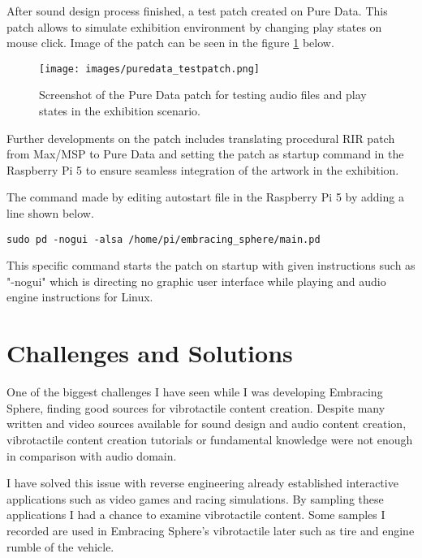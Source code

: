         After sound design process finished, a test patch created on Pure Data. This patch allows to simulate exhibition environment by changing play states on mouse click. Image of the patch can be seen in the figure \ref{fig:PUREDATA} below.\par

        \begin{figure}[H]
            \centering
            \texttt{[image: images/puredata\_testpatch.png]}
            \caption{Screenshot of the Pure Data patch for testing audio files and play states in the exhibition scenario.}
            \label{fig:PUREDATA}
        \end{figure}

        Further developments on the patch includes translating procedural RIR patch from Max/MSP to Pure Data and setting the patch as startup command in the Raspberry Pi 5 to ensure seamless integration of the artwork in the exhibition.\par

        The command made by editing autostart file in the Raspberry Pi 5 by adding a line shown below.\par
        
        \begin{verbatim}
sudo pd -nogui -alsa /home/pi/embracing_sphere/main.pd
        \end{verbatim}
        
        This specific command starts the patch on startup with given instructions such as "-nogui" which is directing no graphic user interface while playing and audio engine instructions for Linux.\par
    \section{Challenges and Solutions}
        One of the biggest challenges I have seen while I was developing Embracing Sphere, finding  good sources for vibrotactile content creation. Despite many written and video sources available for sound design and audio content creation, vibrotactile content creation tutorials or fundamental knowledge were not enough in comparison with audio domain.\par

        I have solved this issue with reverse engineering already established interactive applications such as video games and racing simulations. By sampling these applications I had a chance to examine vibrotactile content. Some samples I recorded are used in Embracing Sphere's vibrotactile later such as tire and engine rumble of the vehicle.\par

